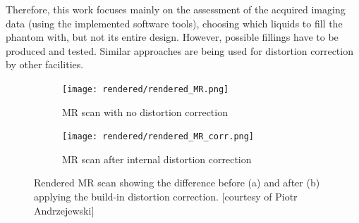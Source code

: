 Therefore, this work focuses mainly on the assessment of the acquired imaging data (using the implemented software tools), choosing which liquids to fill the phantom with, but not its entire design.
However, possible fillings have to be produced and tested.
Similar approaches are being used for distortion correction by other facilities. \cite{Price2015, Petersch2004, Torfeh2015, Wang2004, Wang2004a, Mizowaki2000}


\begin{figure}[!thb]
\centering
  \begin{subfigure}[b]{0.49\textwidth}
  \centering
    \texttt{[image: rendered/rendered\_MR.png]}
    \caption{MR scan with no distortion correction}
    \label{fig:rendered_MR}
  \end{subfigure}
  \begin{subfigure}[b]{0.49\textwidth}
  \centering
      \texttt{[image: rendered/rendered\_MR\_corr.png]}
    \caption{MR scan after internal distortion correction}
    \label{fig:rendered_MR_corr}
  \end{subfigure}
  \caption{Rendered MR scan showing the difference before (a) and after (b) applying the build-in distortion correction. [courtesy of Piotr Andrzejewski]}
  \label{fig:rendered_dist}
\end{figure}


